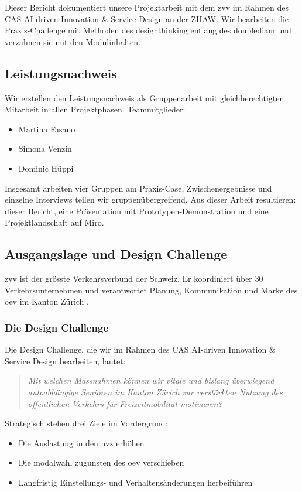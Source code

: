 Dieser Bericht dokumentiert unsere Projektarbeit mit dem \gls{zvv} im Rahmen des CAS AI-driven Innovation \& Service Design an der ZHAW.
Wir bearbeiten die Praxis-Challenge mit Methoden des \gls{designthinking} entlang des \gls{doublediam} und verzahnen sie mit den Modulinhalten.

\subsection{Leistungsnachweis}
Wir erstellen den Leistungsnachweis als Gruppenarbeit mit gleichberechtigter Mitarbeit in allen Projektphasen.
Teammitglieder:

\begin{itemize}
  \item Martina Fasano
  \item Simona Venzin
  \item Dominic Hüppi
\end{itemize}

Insgesamt arbeiten vier Gruppen am Praxis-Case, Zwischenergebnisse und einzelne Interviews teilen wir gruppenübergreifend.
Aus dieser Arbeit resultieren: dieser Bericht, eine Präsentation mit Prototypen-Demonstration und eine Projektlandschaft auf Miro.

\subsection{Ausgangslage und Design Challenge}
\Gls{zvv} ist der grösste Verkehrsverbund der Schweiz.
Er koordiniert über 30 Verkehrsunternehmen und verantwortet Planung, Kommunikation und Marke des \gls{oev} im Kanton Zürich \parencite{zvvbriefing2026}.

\subsubsection{Die Design Challenge}
Die Design Challenge, die wir im Rahmen des CAS AI-driven Innovation \& Service Design bearbeiten, lautet:
\begin{quote}
\textit{Mit welchen Massnahmen können wir vitale und bislang überwiegend autoabhängige Senioren im Kanton Zürich zur verstärkten Nutzung des öffentlichen Verkehrs für Freizeitmobilität motivieren?}
\end{quote}

Strategisch stehen drei Ziele im Vordergrund:
\begin{itemize}
  \item Die Auslastung in den \gls{nvz} erhöhen
  \item Die \gls{modalwahl} zugunsten des \gls{oev} verschieben
  \item Langfristig Einstellungs- und Verhaltensänderungen herbeiführen
\end{itemize}

